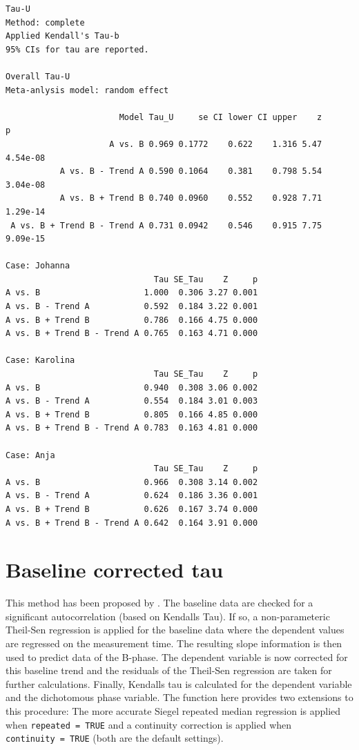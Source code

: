 \documentclass[
]{book}
\begin{document}
\begin{verbatim}
Tau-U
Method: complete 
Applied Kendall's Tau-b
95% CIs for tau are reported.

Overall Tau-U
Meta-anlysis model: random effect

                       Model Tau_U     se CI lower CI upper    z        p
                     A vs. B 0.969 0.1772    0.622    1.316 5.47 4.54e-08
           A vs. B - Trend A 0.590 0.1064    0.381    0.798 5.54 3.04e-08
           A vs. B + Trend B 0.740 0.0960    0.552    0.928 7.71 1.29e-14
 A vs. B + Trend B - Trend A 0.731 0.0942    0.546    0.915 7.75 9.09e-15

Case: Johanna 
                              Tau SE_Tau    Z     p
A vs. B                     1.000  0.306 3.27 0.001
A vs. B - Trend A           0.592  0.184 3.22 0.001
A vs. B + Trend B           0.786  0.166 4.75 0.000
A vs. B + Trend B - Trend A 0.765  0.163 4.71 0.000

Case: Karolina 
                              Tau SE_Tau    Z     p
A vs. B                     0.940  0.308 3.06 0.002
A vs. B - Trend A           0.554  0.184 3.01 0.003
A vs. B + Trend B           0.805  0.166 4.85 0.000
A vs. B + Trend B - Trend A 0.783  0.163 4.81 0.000

Case: Anja 
                              Tau SE_Tau    Z     p
A vs. B                     0.966  0.308 3.14 0.002
A vs. B - Trend A           0.624  0.186 3.36 0.001
A vs. B + Trend B           0.626  0.167 3.74 0.000
A vs. B + Trend B - Trend A 0.642  0.164 3.91 0.000
\end{verbatim}

\hypertarget{baseline-corrected-tau}{%
\section{Baseline corrected tau}\label{baseline-corrected-tau}}

This method has been proposed by \citet{tarlowImprovedRankCorrelation2016a}. The baseline data are checked for a significant autocorrelation (based on Kendalls Tau). If so, a non-parameteric Theil-Sen regression is applied for the baseline data where the dependent values are regressed on the measurement time. The resulting slope information is then used to predict data of the B-phase. The dependent variable is now corrected for this baseline trend and the residuals of the Theil-Sen regression are taken for further calculations. Finally, Kendalls tau is calculated for the dependent variable and the dichotomous phase variable. The function here provides two extensions to this procedure: The more accurate Siegel repeated median regression is applied when \texttt{repeated\ =\ TRUE} \citep{siegelRobustRegressionUsing1982} and a continuity correction is applied when \texttt{continuity\ =\ TRUE} (both are the default settings).
\end{document}
